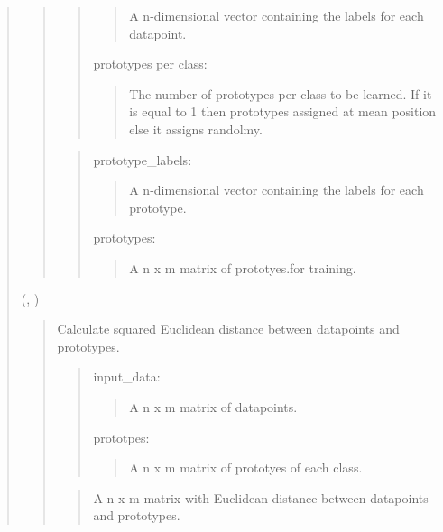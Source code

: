 \documentclass[letterpaper,10pt,english,openany,oneside]{sphinxmanual}
\begin{document}
\begin{quote}
\begin{quote}
\begin{quote}
\begin{quote}
A n-dimensional vector containing the labels for each datapoint.
\end{quote}

prototypes per class:
\begin{quote}

The number of prototypes per class to be learned. If it is equal to 1 then prototypes assigned at mean position else it assigns randolmy.
\end{quote}
\end{quote}

\begin{quote}

prototype\_labels:
\begin{quote}

A n-dimensional vector containing the labels for each prototype.
\end{quote}

prototypes:
\begin{quote}

A n x m matrix of prototyes.for training.
\end{quote}
\end{quote}
\end{quote}

(, )
\begin{quote}

Calculate squared Euclidean distance between datapoints and prototypes.

\begin{quote}

input\_data:
\begin{quote}

A n x m matrix of datapoints.
\end{quote}

prototpes:
\begin{quote}

A n x m matrix of prototyes of each class.
\end{quote}
\end{quote}

\begin{quote}

A n x m matrix with Euclidean distance between datapoints and prototypes.
\end{quote}
\end{quote}


\end{quote}
\end{document}
